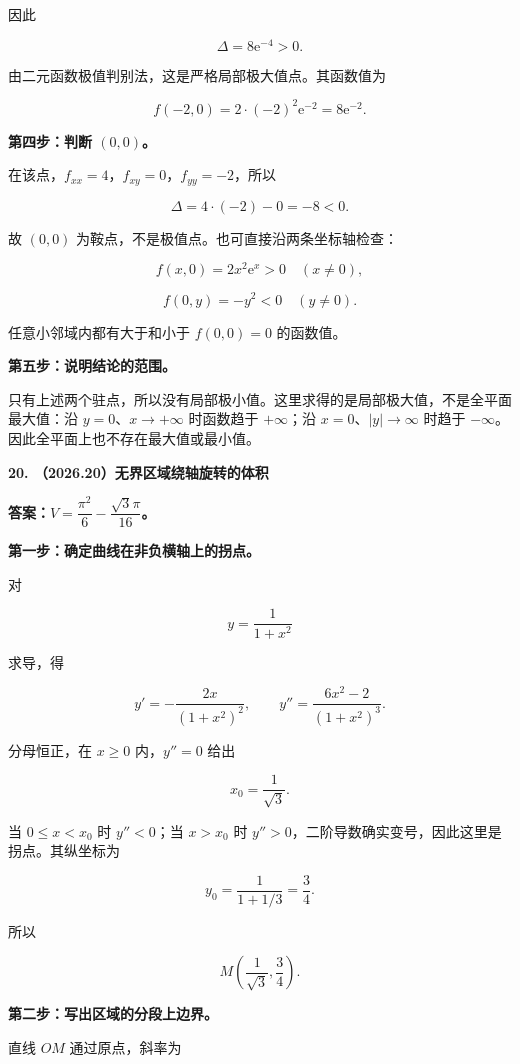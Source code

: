 \documentclass[UTF8,11pt,fontset=windows]{ctexart}
\begin{document}
因此

$$
\Delta=8\mathrm{e}^{-4}>0.
$$

由二元函数极值判别法，这是严格局部极大值点。其函数值为

$$
f(-2,0)=2\cdot(-2)^2\mathrm{e}^{-2}
=\boxed{8\mathrm{e}^{-2}}.
$$

\textbf{第四步：判断 $(0,0)$。}

在该点，$f_{xx}=4$，$f_{xy}=0$，$f_{yy}=-2$，所以

$$
\Delta=4\cdot(-2)-0=-8<0.
$$

故 $(0,0)$ 为鞍点，不是极值点。也可直接沿两条坐标轴检查：

$$
f(x,0)=2x^2\mathrm{e}^x>0\quad(x\ne0),
$$

$$
f(0,y)=-y^2<0\quad(y\ne0).
$$

任意小邻域内都有大于和小于 $f(0,0)=0$ 的函数值。

\textbf{第五步：说明结论的范围。}

只有上述两个驻点，所以没有局部极小值。这里求得的是局部极大值，不是全平面最大值：沿 $y=0$、$x\to+\infty$ 时函数趋于 $+\infty$；沿 $x=0$、$|y|\to\infty$ 时趋于 $-\infty$。因此全平面上也不存在最大值或最小值。

\clearpage

\textbf{20. （2026.20）无界区域绕轴旋转的体积}

\textbf{答案：$V=\dfrac{\pi^2}{6}-\dfrac{\sqrt3\pi}{16}$。}

\textbf{第一步：确定曲线在非负横轴上的拐点。}

对

$$
y=\frac1{1+x^2}
$$

求导，得

$$
y'=-\frac{2x}{(1+x^2)^2},
\qquad
 y''=\frac{6x^2-2}{(1+x^2)^3}.
$$

分母恒正，在 $x\ge0$ 内，$y''=0$ 给出

$$
x_0=\frac1{\sqrt3}.
$$

当 $0\le x<x_0$ 时 $y''<0$；当 $x>x_0$ 时 $y''>0$，二阶导数确实变号，因此这里是拐点。其纵坐标为

$$
y_0=\frac1{1+1/3}=\frac34.
$$

所以

$$
M\left(\frac1{\sqrt3},\frac34\right).
$$

\textbf{第二步：写出区域的分段上边界。}

直线 $OM$ 通过原点，斜率为
\end{document}
